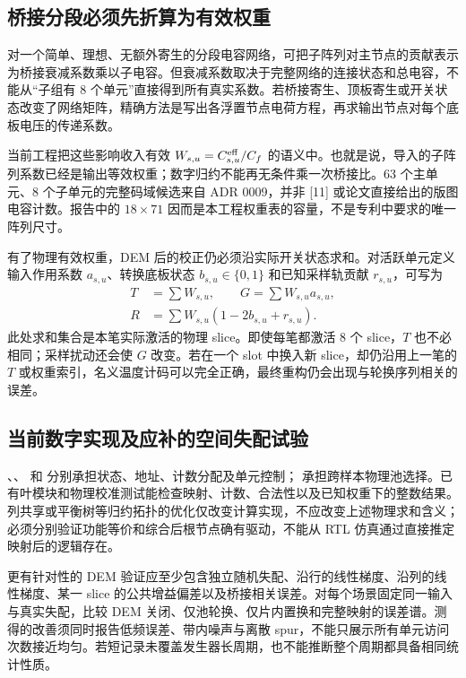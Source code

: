 \subsection{桥接分段必须先折算为有效权重}
对一个简单、理想、无额外寄生的分段电容网络，可把子阵列对主节点的贡献表示为桥接衰减系数乘以子电容。但衰减系数取决于完整网络的连接状态和总电容，不能从“子组有 8 个单元”直接得到所有真实系数。若桥接寄生、顶板寄生或开关状态改变了网络矩阵，精确方法是写出各浮置节点电荷方程，再求输出节点对每个底板电压的传递系数。

当前工程把这些影响收入有效 \(W_{s,u}=C^{\rm eff}_{s,u}/C_f\) 的语义中。也就是说，导入的子阵列系数已经是输出等效权重；数字归约不能再无条件乘一次桥接比。63 个主单元、8 个子单元的完整码域候选来自 ADR 0009，并非 [11] 或论文直接给出的版图电容计数。报告中的 \(18\times71\) 因而是本工程权重表的容量，不是专利中要求的唯一阵列尺寸。

有了物理有效权重，DEM 后的校正仍必须沿实际开关状态求和。对活跃单元定义输入作用系数 \(a_{s,u}\)、转换底板状态 \(b_{s,u}\in\{0,1\}\) 和已知采样轨贡献 \(r_{s,u}\)，可写为
\begin{align}
T&=\sum W_{s,u},\qquad G=\sum W_{s,u}a_{s,u},\\
R&=\sum W_{s,u}(1-2b_{s,u}+r_{s,u}).
\end{align}
此处求和集合是本笔实际激活的物理 slice。即使每笔都激活 8 个 slice，\(T\) 也不必相同；采样扰动还会使 \(G\) 改变。若在一个 slot 中换入新 slice，却仍沿用上一笔的 \(T\) 或权重索引，名义温度计码可以完全正确，最终重构仍会出现与轮换序列相关的误差。

\subsection{当前数字实现及应补的空间失配试验}
、、 和  分别承担状态、地址、计数分配及单元控制； 承担跨样本物理池选择。已有叶模块和物理校准测试能检查映射、计数、合法性以及已知权重下的整数结果。列共享或平衡树等归约拓扑的优化仅改变计算实现，不应改变上述物理求和含义；必须分别验证功能等价和综合后根节点确有驱动，不能从 RTL 仿真通过直接推定映射后的逻辑存在。

更有针对性的 DEM 验证应至少包含独立随机失配、沿行的线性梯度、沿列的线性梯度、某一 slice 的公共增益偏差以及桥接相关误差。对每个场景固定同一输入与真实失配，比较 DEM 关闭、仅池轮换、仅片内置换和完整映射的误差谱。测得的改善须同时报告低频误差、带内噪声与离散 spur，不能只展示所有单元访问次数接近均匀。若短记录未覆盖发生器长周期，也不能推断整个周期都具备相同统计性质。

